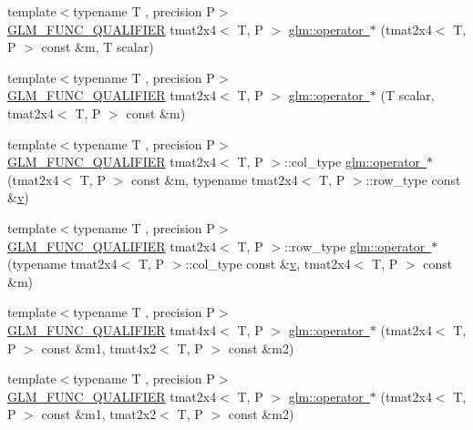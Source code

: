 \begin{DoxyCompactItemize}
\item 
{\footnotesize template$<$typename T , precision P$>$ }\\\mbox{\hyperlink{setup_8hpp_a33fdea6f91c5f834105f7415e2a64407}{G\+L\+M\+\_\+\+F\+U\+N\+C\+\_\+\+Q\+U\+A\+L\+I\+F\+I\+ER}} tmat2x4$<$ T, P $>$ \mbox{\hyperlink{namespaceglm_aab19310f007830a7fde3cde3ce0e19a6}{glm\+::operator $\ast$}} (tmat2x4$<$ T, P $>$ const \&m, T scalar)
\item 
{\footnotesize template$<$typename T , precision P$>$ }\\\mbox{\hyperlink{setup_8hpp_a33fdea6f91c5f834105f7415e2a64407}{G\+L\+M\+\_\+\+F\+U\+N\+C\+\_\+\+Q\+U\+A\+L\+I\+F\+I\+ER}} tmat2x4$<$ T, P $>$ \mbox{\hyperlink{namespaceglm_a7511358a37104aa235509d80a77bc1fb}{glm\+::operator $\ast$}} (T scalar, tmat2x4$<$ T, P $>$ const \&m)
\item 
{\footnotesize template$<$typename T , precision P$>$ }\\\mbox{\hyperlink{setup_8hpp_a33fdea6f91c5f834105f7415e2a64407}{G\+L\+M\+\_\+\+F\+U\+N\+C\+\_\+\+Q\+U\+A\+L\+I\+F\+I\+ER}} tmat2x4$<$ T, P $>$\+::col\+\_\+type \mbox{\hyperlink{namespaceglm_ad076c6db32e27fc1b9db67440f5fa453}{glm\+::operator $\ast$}} (tmat2x4$<$ T, P $>$ const \&m, typename tmat2x4$<$ T, P $>$\+::row\+\_\+type const \&\mbox{\hyperlink{glad_8h_a14cfbe2fc2234f5504618905b69d1e06}{v}})
\item 
{\footnotesize template$<$typename T , precision P$>$ }\\\mbox{\hyperlink{setup_8hpp_a33fdea6f91c5f834105f7415e2a64407}{G\+L\+M\+\_\+\+F\+U\+N\+C\+\_\+\+Q\+U\+A\+L\+I\+F\+I\+ER}} tmat2x4$<$ T, P $>$\+::row\+\_\+type \mbox{\hyperlink{namespaceglm_a067b6d9a3e2e7202f1b91861e1f4bb69}{glm\+::operator $\ast$}} (typename tmat2x4$<$ T, P $>$\+::col\+\_\+type const \&\mbox{\hyperlink{glad_8h_a14cfbe2fc2234f5504618905b69d1e06}{v}}, tmat2x4$<$ T, P $>$ const \&m)
\item 
{\footnotesize template$<$typename T , precision P$>$ }\\\mbox{\hyperlink{setup_8hpp_a33fdea6f91c5f834105f7415e2a64407}{G\+L\+M\+\_\+\+F\+U\+N\+C\+\_\+\+Q\+U\+A\+L\+I\+F\+I\+ER}} tmat4x4$<$ T, P $>$ \mbox{\hyperlink{namespaceglm_af213fe630313fd75f9ba8771f3d26315}{glm\+::operator $\ast$}} (tmat2x4$<$ T, P $>$ const \&m1, tmat4x2$<$ T, P $>$ const \&m2)
\item 
{\footnotesize template$<$typename T , precision P$>$ }\\\mbox{\hyperlink{setup_8hpp_a33fdea6f91c5f834105f7415e2a64407}{G\+L\+M\+\_\+\+F\+U\+N\+C\+\_\+\+Q\+U\+A\+L\+I\+F\+I\+ER}} tmat2x4$<$ T, P $>$ \mbox{\hyperlink{namespaceglm_a4e74d29f774dfcce0c6432a6624d235a}{glm\+::operator $\ast$}} (tmat2x4$<$ T, P $>$ const \&m1, tmat2x2$<$ T, P $>$ const \&m2)

\end{DoxyCompactItemize}
